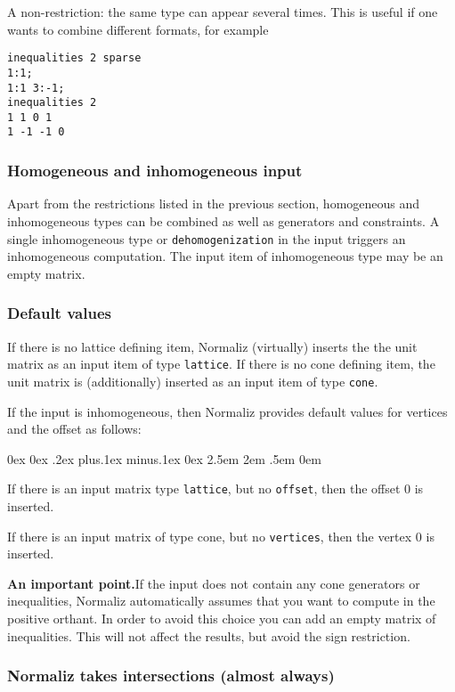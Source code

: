 \documentclass[12pt,a4paper]{scrartcl}
\newcounter{listi}
\newcommand{\stdli}{ \topsep0ex \partopsep0ex %
\parsep.2ex plus.1ex minus.1ex \itemsep0ex%
\leftmargin2.5em \labelwidth2em \labelsep.5em \rightmargin0em}%
\newenvironment{arab}{\begin{list}{\textup{(\arabic{listi})}}%
	{\usecounter{listi}\stdli}}{\end{list}}
\theoremstyle{definition}
\def\ttt{\texttt}
\begin{document}
A non-restriction: the same type can appear several times. This is useful if one wants to combine different formats, for example
\begin{Verbatim}
inequalities 2 sparse
1:1;
1:1 3:-1;
inequalities 2
1 1 0 1
1 -1 -1 0
\end{Verbatim}

\subsubsection{Homogeneous and inhomogeneous input}\label{inhom_inp}

Apart from the restrictions listed in the previous section, homogeneous and inhomogeneous types can be combined as well as generators and constraints. A single inhomogeneous type or \verb|dehomogenization| in the input triggers an inhomogeneous computation. The input item of inhomogeneous type may be an empty matrix.

\subsubsection{Default values}\label{default}

If there is no lattice defining item, Normaliz (virtually) inserts the the unit matrix as an input item of type \ttt{lattice}. If there is no cone defining item, the unit matrix is (additionally) inserted as an input item of type \ttt{cone}.

If the input is inhomogeneous, then Normaliz provides default values for vertices and the offset as follows:
\begin{arab}
	\item If there is an input matrix type \verb|lattice|, but no \ttt{offset}, then the offset $0$ is inserted.
	\item If there is an input matrix of type cone, but no \ttt{vertices}, then the vertex $0$ is inserted. 
\end{arab}

\textbf{An important point.}\enspace If the input does not contain any cone generators or inequalities, Normaliz automatically assumes that you want to compute in the positive orthant. In order to avoid this choice you can add an empty matrix of inequalities. This will not affect the results, but avoid the sign restriction.



\subsubsection{Normaliz takes intersections (almost always)}
\end{document}

